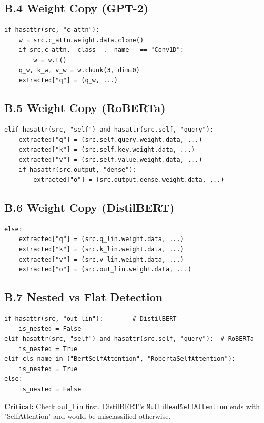 \subsection{B.4 Weight Copy (GPT-2)}

\begin{lstlisting}
if hasattr(src, "c_attn"):
    w = src.c_attn.weight.data.clone()
    if src.c_attn.__class__.__name__ == "Conv1D":
        w = w.t()
    q_w, k_w, v_w = w.chunk(3, dim=0)
    extracted["q"] = (q_w, ...)
\end{lstlisting}

\subsection{B.5 Weight Copy (RoBERTa)}

\begin{lstlisting}
elif hasattr(src, "self") and hasattr(src.self, "query"):
    extracted["q"] = (src.self.query.weight.data, ...)
    extracted["k"] = (src.self.key.weight.data, ...)
    extracted["v"] = (src.self.value.weight.data, ...)
    if hasattr(src.output, "dense"):
        extracted["o"] = (src.output.dense.weight.data, ...)
\end{lstlisting}

\subsection{B.6 Weight Copy (DistilBERT)}

\begin{lstlisting}
else:
    extracted["q"] = (src.q_lin.weight.data, ...)
    extracted["k"] = (src.k_lin.weight.data, ...)
    extracted["v"] = (src.v_lin.weight.data, ...)
    extracted["o"] = (src.out_lin.weight.data, ...)
\end{lstlisting}

\subsection{B.7 Nested vs Flat Detection}

\begin{lstlisting}
if hasattr(src, "out_lin"):        # DistilBERT
    is_nested = False
elif hasattr(src, "self") and hasattr(src.self, "query"):  # RoBERTa
    is_nested = True
elif cls_name in ("BertSelfAttention", "RobertaSelfAttention"):
    is_nested = True
else:
    is_nested = False
\end{lstlisting}

\textbf{Critical:} Check \texttt{out\_lin} first. DistilBERT's \texttt{MultiHeadSelfAttention} 
ends with "SelfAttention" and would be misclassified otherwise.

